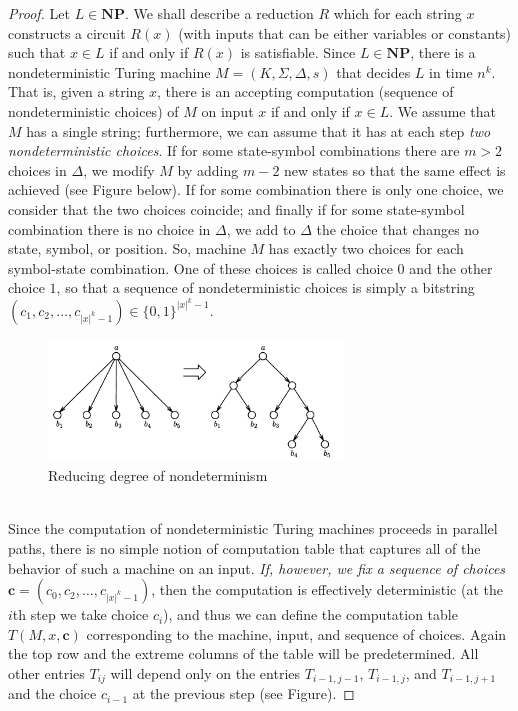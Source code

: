 \documentclass[12pt]{article}
\begin{document}
\begin{proof}
Let $L \in \mathbf{NP}$. We shall describe a reduction $R$ which for each string $x$ constructs a circuit $R(x)$ (with inputs that can be either variables or constants) such that $x \in L$ if and only if $R(x)$ is satisfiable. Since $L \in \mathbf{NP}$, there is a nondeterministic Turing machine $M = (K, \Sigma, \Delta, s)$ that decides $L$ in time $n^k$. That is, given a string $x$, there is an accepting computation (sequence of nondeterministic choices) of $M$ on input $x$ if and only if $x \in L$. We assume that $M$ has a single string; furthermore, we can assume that it has at each step \emph{two nondeterministic choices}.
 If for some state-symbol combinations there are $m > 2$ choices in $\Delta$, we modify $M$ by adding $m - 2$ new states so that the same effect is achieved (see Figure below). If for some combination there is only one choice, we consider that the two choices coincide; and finally if for some state-symbol combination there is no choice in $\Delta$, we add to $\Delta$ the choice that changes no state, symbol, or position. So, machine $M$ has exactly two choices for each symbol-state combination. One of these choices is called choice $0$ and the other choice $1$, so that a sequence of nondeterministic choices is simply a bitstring $(c_1, c_2, \ldots, c_{|x|^{k}-1}) \in \{0,1\}^{|x|^{k}-1}$.
 \begin{figure}[h]
  \centering
  \includegraphics[width=0.7\textwidth]{img/cook.png}
  \caption{Reducing degree of nondeterminism}
\end{figure}
\\
Since the computation of nondeterministic Turing machines proceeds in parallel paths, there is no simple notion of computation table that captures all of the behavior of such a machine on an input. \emph{If, however, we fix a sequence of choices} $\mathbf{c} = (c_0, c_2, \ldots, c_{|x|^k - 1})$, then the computation is effectively deterministic (at the $i$th step we take choice $c_i$), and thus we can define the computation table $T(M, x, \mathbf{c})$ corresponding to the machine, input, and sequence of choices. Again the top row and the extreme columns of the table will be predetermined. All other entries $T_{ij}$ will depend only on the entries $T_{i-1,j-1}$, $T_{i-1,j}$, and $T_{i-1,j+1}$ and the choice $c_{i-1}$ at the previous step (see Figure).

\end{proof}
\end{document}
